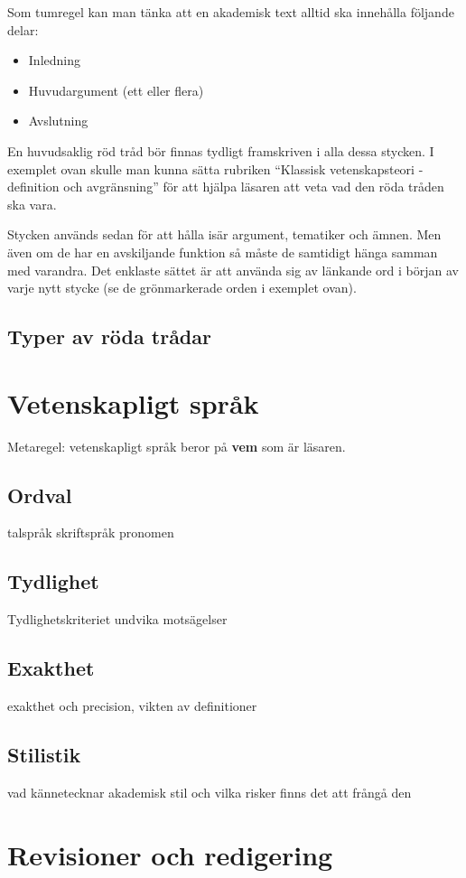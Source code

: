 \documentclass[11pt,a4paper,footinclude=true,headinclude=true]{report} %
\begin{document}
Som tumregel kan man tänka att en akademisk text alltid ska innehålla följande delar:

\begin{itemize}
\item Inledning
\item Huvudargument (ett eller flera)
\item Avslutning
\end{itemize}

En huvudsaklig röd tråd bör finnas tydligt framskriven i alla dessa stycken. I exemplet ovan skulle man kunna sätta rubriken ``Klassisk vetenskapsteori - definition och avgränsning'' för att hjälpa läsaren att veta vad den röda tråden ska vara. 

Stycken används sedan för att hålla isär argument, tematiker och ämnen. Men även om de har en avskiljande funktion så måste de samtidigt hänga samman med varandra. Det enklaste sättet är att använda sig av länkande ord i början av varje nytt stycke (se de grönmarkerade orden i exemplet ovan). 



\section{Typer av röda trådar}
        




\chapter{Vetenskapligt språk}
           
           Metaregel: vetenskapligt språk beror på \textbf{vem} som är läsaren.

\section{Ordval}
talspråk skriftspråk pronomen
\section{Tydlighet}
Tydlighetskriteriet undvika motsägelser 
\section{Exakthet}
exakthet och precision, vikten av definitioner
\section{Stilistik}
vad kännetecknar akademisk stil och vilka risker finns det att frångå den







    \chapter{Revisioner och redigering}
    
    
 
\end{document}
